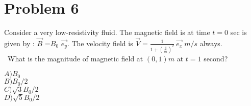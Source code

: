 \documentclass[11pt,a4paper,fleqn]{scrartcl}
\begin{document}
\begin{problem}
\begin{center}
{}

\end{center}
\end{problem}


\section{Problem 6}
\begin{problem}

Consider a very low-resistivity fluid. The magnetic field is at time $t=0$ sec is given by : $\vec{B}$
=$B_0$ $\vec{e_y}$. The velocity field is $\vec{V}= \frac{1}{1+\left(\frac{y}{m}\right)^2} \ \vec{e_x}\  m/s$ always.\\\
What is the magnitude of magnetic field at $(0,1)m$ at $t=1$ second?

$A) B_0 $\\
$B) B_0 /2$\\
$C) \sqrt{3} B_0/2$\\
$D) \sqrt{5} B_0/2$


\end{problem}
\end{document}
